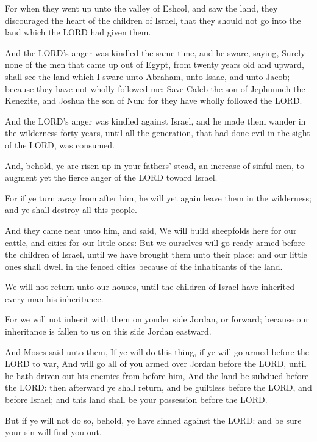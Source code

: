 \verse For when they went up unto the valley of Eshcol, and saw the
land, they discouraged the heart of the children of Israel, that they
should not go into the land which the LORD had given them.

\verse And the LORD's anger was kindled the same time, and he sware,
saying, \verse Surely none of the men that came up out of Egypt, from
twenty years old and upward, shall see the land which I sware unto
Abraham, unto Isaac, and unto Jacob; because they have not wholly
followed me: \verse Save Caleb the son of Jephunneh the Kenezite, and
Joshua the son of Nun: for they have wholly followed the LORD.

\verse And the LORD's anger was kindled against Israel, and he made
them wander in the wilderness forty years, until all the generation,
that had done evil in the sight of the LORD, was consumed.

\verse And, behold, ye are risen up in your fathers' stead, an increase
of sinful men, to augment yet the fierce anger of the LORD toward
Israel.

\verse For if ye turn away from after him, he will yet again leave them
in the wilderness; and ye shall destroy all this people.

\verse And they came near unto him, and said, We will build sheepfolds
here for our cattle, and cities for our little ones: \verse But we
ourselves will go ready armed before the children of Israel, until we
have brought them unto their place: and our little ones shall dwell in
the fenced cities because of the inhabitants of the land.

\verse We will not return unto our houses, until the children of Israel
have inherited every man his inheritance.

\verse For we will not inherit with them on yonder side Jordan, or
forward; because our inheritance is fallen to us on this side Jordan
eastward.

\verse And Moses said unto them, If ye will do this thing, if ye will
go armed before the LORD to war, \verse And will go all of you armed
over Jordan before the LORD, until he hath driven out his enemies from
before him, \verse And the land be subdued before the LORD: then
afterward ye shall return, and be guiltless before the LORD, and
before Israel; and this land shall be your possession before the LORD.

\verse But if ye will not do so, behold, ye have sinned against the
LORD: and be sure your sin will find you out.

